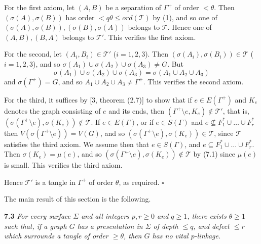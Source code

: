 For the first axiom, let $(A, B)$ be a separation of $\Gamma^+$ of order $< \theta$. Then $(\sigma(A), \sigma(B))$ has order $< q\theta \le ord(\mathcal{T})$ by (1), and so one of $(\sigma(A), \sigma(B)), (\sigma(B), \sigma(A))$ belongs to $\mathcal{T}$. Hence one of $(A, B), (B, A)$ belongs to $\mathcal{T}'$. This verifies the first axiom.

For the second, let $(A_i, B_i) \in \mathcal{T}'$ ($i = 1, 2, 3$). Then $(\sigma(A_i), \sigma(B_i)) \in \mathcal{T}$ ($i = 1, 2, 3$), and so $\sigma(A_1) \cup \sigma(A_2) \cup \sigma(A_3) \ne G$. But
\begin{equation*}
\sigma(A_1) \cup \sigma(A_2) \cup \sigma(A_3) = \sigma(A_1 \cup A_2 \cup A_3)
\end{equation*}
and $\sigma(\Gamma^+) = G$, and so $A_1 \cup A_2 \cup A_3 \ne \Gamma^+$. This verifies the second axiom.

For the third, it suffices by [3, theorem (2.7)] to show that if $e \in E(\Gamma^+)$ and $K_e$ denotes the graph consisting of $e$ and its ends, then $(\Gamma^+ \setminus e, K_e) \notin \mathcal{T}'$, that is, $(\sigma(\Gamma^+ \setminus e), \sigma(K_e)) \notin \mathcal{T}$. If $e \in E(\Gamma)$, or if $e \in S(\Gamma)$ and $e \nsubseteq F_1^* \cup \dots \cup F_r^*$ then $V(\sigma(\Gamma^+ \setminus e)) = V(G)$, and so $(\sigma(\Gamma^+ \setminus e), \sigma(K_e)) \in \mathcal{T}$, since $\mathcal{T}$ satisfies the third axiom. We assume then that $e \in S(\Gamma)$, and $e \subseteq F_1^* \cup \dots \cup F_r^*$. Then $\sigma(K_e) = \mu(e)$, and so $(\sigma(\Gamma^+ \setminus e), \sigma(K_e)) \notin \mathcal{T}$ by (7.1) since $\mu(e)$ is small. This verifies the third axiom.

Hence $\mathcal{T}'$ is a tangle in $\Gamma^+$ of order $\theta$, as required. $\square$

The main result of this section is the following.

\textbf{7.3} \textit{For every surface $\Sigma$ and all integers $p, r \ge 0$ and $q \ge 1$, there exists $\theta \ge 1$ such that, if a graph $G$ has a presentation in $\Sigma$ of depth $\le q$, and defect $\le r$ which surrounds a tangle of order $\ge \theta$, then $G$ has no vital $p$-linkage.}

